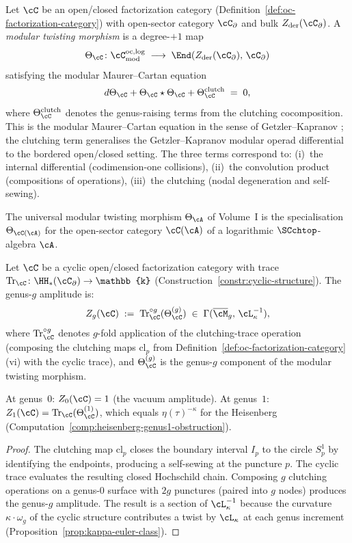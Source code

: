 \begin{definition}
\label{def:modular-twisting-morphism}
Let $\cC$ be an open/closed factorization category (Definition~\ref{def:oc-factorization-category}) with open-sector category $\cC_\partial$ and bulk $Z_{\mathrm{der}}(\cC_\partial)$. A \emph{modular twisting morphism} is a degree-$+1$ map
\[
\Theta_\cC \colon \cC^{\mathrm{oc,log}}_{\mathrm{mod}} \;\longrightarrow\; \End(Z_{\mathrm{der}}(\cC_\partial),\, \cC_\partial)
\]
satisfying the modular Maurer--Cartan equation
\[
d\Theta_\cC + \Theta_\cC \star \Theta_\cC + \Theta_\cC^{\mathrm{clutch}} \;=\; 0,
\]
where $\Theta_\cC^{\mathrm{clutch}}$ denotes the genus-raising terms from the clutching cocomposition. This is the modular Maurer--Cartan equation in the sense of Getzler--Kapranov \cite{GK98}; the clutching term generalises the Getzler--Kapranov modular operad differential to the bordered open/closed setting. The three terms correspond to: (i)~the internal differential (codimension-one collisions), (ii)~the convolution product (compositions of operations), (iii)~the clutching (nodal degeneration and self-sewing).

The universal modular twisting morphism $\Theta_\cA$ of Volume~I is the specialisation $\Theta_{\cC(\cA)}$ for the open-sector category $\cC(\cA)$ of a logarithmic $\SCchtop$-algebra $\cA$.
\end{definition}

\begin{theorem}
\label{thm:genus-g-traces}
Let $\cC$ be a cyclic open/closed factorization category with trace $\Tr_\cC \colon \HH_\ast(\cC_\partial) \to \mathbb{k}$ (Construction~\textup{\ref{constr:cyclic-structure}}). The genus-$g$ amplitude is:
\[
Z_g(\cC) \;:=\; \Tr_\cC^{\circ g}(\Theta_\cC^{(g)}) \;\in\; \Gamma(\overline{\cM}_g,\, \cL_\kappa^{-1}),
\]
where $\Tr_\cC^{\circ g}$ denotes $g$-fold application of the clutching-trace operation (composing the clutching maps $\mathrm{cl}_p$ from Definition~\textup{\ref{def:oc-factorization-category}(vi)} with the cyclic trace), and $\Theta_\cC^{(g)}$ is the genus-$g$ component of the modular twisting morphism.

At genus~$0$: $Z_0(\cC) = 1$ (the vacuum amplitude).
At genus~$1$: $Z_1(\cC) = \Tr_\cC(\Theta_\cC^{(1)})$, which equals $\eta(\tau)^{-\kappa}$ for the Heisenberg (Computation~\textup{\ref{comp:heisenberg-genus1-obstruction}}).
\end{theorem}

\begin{proof}
The clutching map $\mathrm{cl}_p$ closes the boundary interval $I_p$ to the circle $S^1_p$ by identifying the endpoints, producing a self-sewing at the puncture $p$. The cyclic trace evaluates the resulting closed Hochschild chain. Composing $g$ clutching operations on a genus-$0$ surface with $2g$ punctures (paired into $g$ nodes) produces the genus-$g$ amplitude. The result is a section of $\cL_\kappa^{-1}$ because the curvature $\kappa \cdot \omega_g$ of the cyclic structure contributes a twist by $\cL_\kappa$ at each genus increment (Proposition~\ref{prop:kappa-euler-class}).
\end{proof}

